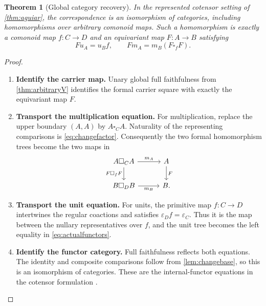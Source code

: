 \documentclass[11pt,reqno]{amsart}
\theoremstyle{plain}
\newtheorem{theorem}{Theorem}[section]
\theoremstyle{definition}
\theoremstyle{remark}
\numberwithin{equation}{section}
\newcommand{\eps}{\varepsilon}
\begin{document}
\begin{theorem}[Global category recovery]\label{thm:globalaguiar}
In the represented cotensor setting of \cref{thm:aguiar}, the
correspondence is an isomorphism of categories, including homomorphisms
over arbitrary comonoid maps. Such a homomorphism is exactly a comonoid
map $f:C\to D$ and an equivariant map $F:A\to B$ satisfying
\begin{equation}\label{eq:actualfunctors}
 Fu_A=u_Bf,\qquad
 Fm_A=m_B(F\square_f F).
\end{equation}
\end{theorem}
\begin{proof}\leavevmode
\begin{enumerate}
\item \textbf{Identify the carrier map.} Unary global full faithfulness from \cref{thm:arbitraryV} identifies
the formal carrier square with exactly the equivariant map $F$.

\item \textbf{Transport the multiplication equation.} For multiplication, replace the upper boundary $(A,A)$ by
$A\square_C A$. Naturality of the representing comparisons is
\cref{eq:changefactor}. Consequently the two formal homomorphism
trees become the two maps in
\[
\begin{tikzcd}[column sep=3em]
 A\square_C A \arrow[r,"m_A"] \arrow[d,"F\square_f F"'] &
 A \arrow[d,"F"]\\
 B\square_D B \arrow[r,"m_B"'] &B.
\end{tikzcd}
\]

\item \textbf{Transport the unit equation.} For units, the primitive map $f:C\to D$ intertwines the regular
coactions and satisfies $\eps_Df=\eps_C$. Thus it is the map
between the nullary representatives over $f$, and the unit tree
becomes the left equality in \cref{eq:actualfunctors}.

\item \textbf{Identify the functor category.} Full faithfulness reflects both equations. The identity and composite
comparisons follow from \cref{lem:changebase}, so this is an
isomorphism of categories. These are the internal-functor equations
in the cotensor formulation \cite[Section 4.1]{Aguiar1997}.\qedhere
\end{enumerate}
\end{proof}
\end{document}
